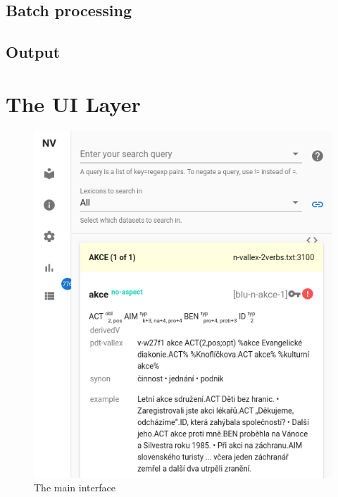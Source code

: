 \documentclass[10pt, a4paper, twocolumn]{article} %
\begin{document}
\subsection{Batch processing}
\subsection{Output}


\section{The UI Layer}

\begin{figure}
    \includegraphics[width=\hsize]{images/ui-main.png}
    \caption{The main interface}
\end{figure}


\end{document}
